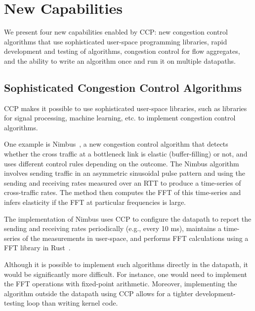 \section{New Capabilities}
\label{s:capabilities}
%
%
We present four new capabilities enabled by CCP: new congestion control algorithms that use sophisticated user-space programming libraries, rapid development and testing of algorithms, congestion control for flow aggregates, and the ability to write an algorithm once and run it on multiple datapaths.

\subsection{Sophisticated Congestion Control Algorithms}
\label{s:capabilities:algs}

CCP makes it possible to use sophisticated user-space libraries, such as libraries for signal processing, machine learning, etc. to implement congestion control algorithms.

One example is Nimbus~\cite{nimbus}, a new congestion control algorithm that detects whether the cross traffic at a bottleneck link is  elastic (buffer-filling) or not, and uses different control rules depending on the outcome. The Nimbus algorithm involves sending traffic in an asymmetric sinusoidal pulse pattern and using the sending and receiving rates measured over an RTT to produce a time-series of cross-traffic rates. The method then computes the FFT of this time-series and infers elasticity if the FFT at particular frequencies is large.

The implementation of Nimbus uses CCP to configure the datapath to report the sending and receiving rates periodically (e.g., every 10 ms), maintains a time-series of the measurements in user-space, and performs FFT calculations using a FFT library in Rust~\cite{rustfft}. 

Although it is possible to implement such algorithms directly in the datapath, it would be significantly more difficult. For instance, one would need to implement the FFT operations with fixed-point arithmetic. Moreover, implementing the algorithm outside the datapath using CCP allows for a tighter development-testing loop than writing kernel code.


